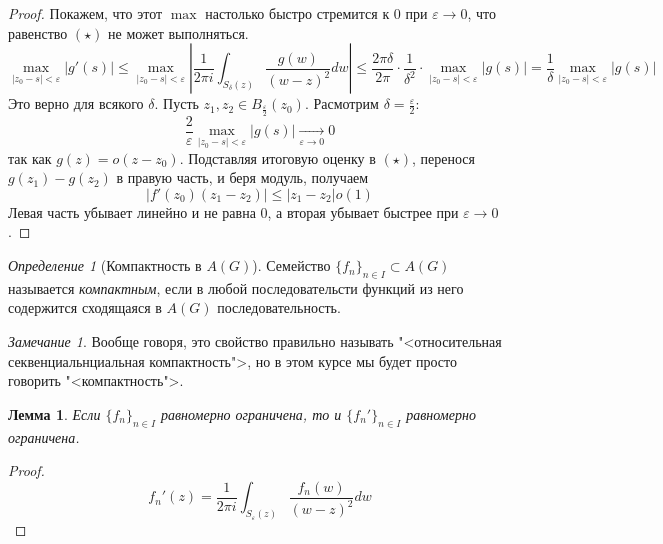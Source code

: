 \documentclass[12pt]{article}
\newcounter{cnt}
\theoremstyle{thmnote}
\newtheorem{lemma}[cnt]{Лемма}
\theoremstyle{remark}
\newtheorem*{remark}{Замечание}
\theoremstyle{defnote}
\newtheorem{definition}[cnt]{Определение}
\begin{document}
\begin{proof}
    Покажем, что этот $\max$ настолько быстро стремится к 0 при $\varepsilon \to 0$, что равенство $(\star)$ не может выполняться.
    \begin{equation*}
        \underset{|z_0 - s| < \varepsilon}{\max} |g'(s)| \leq \underset{|z_0 - s| < \varepsilon}{\max} \left| \frac{1}{2 \pi i} \int_{S_\delta(z)} \frac{g(w)}{(w - z)^2} dw \right| \leq \frac{2 \pi \delta}{2 \pi} \cdot \frac{1}{\delta^2} \cdot \underset{|z_0 - s| < \varepsilon}{\max} |g(s)| = \frac{1}{\delta} \underset{|z_0 - s| < \varepsilon}{\max} |g(s)|
    \end{equation*}
    Это верно для всякого $\delta$. Пусть $z_1, z_2 \in B_{\frac{\varepsilon}{2}}(z_0)$. Расмотрим $\delta = \frac{\varepsilon}{2}$:
    \begin{equation*}
        \frac{2}{\varepsilon} \underset{|z_0 - s| < \varepsilon}{\max} |g(s)| \underset{\varepsilon \to 0}{\longrightarrow} 0
    \end{equation*}
    так как $g(z) = o(z - z_0)$. Подставляя итоговую оценку в $(\star)$, перенося $g(z_1) - g(z_2)$ в правую часть, и беря модуль, получаем
    \begin{equation*}
        |f'(z_0) (z_1 - z_2)| \leq |z_1 - z_2| o(1)
    \end{equation*}
    Левая часть убывает линейно и не равна 0, а вторая убывает быстрее при $\varepsilon \to 0$.
\end{proof}

\begin{definition}[Компактность в $A(G)$]
    Семейство $\{f_n\}_{n \in I} \subset A(G)$ называется \textit{компактным}, если в любой последовательсти функций из него содержится сходящаяся в $A(G)$ последовательность.
\end{definition}
\begin{remark}
    Вообще говоря, это свойство правильно называть "<относительная секвенциальнциальная компактность">, но в этом курсе мы будет просто говорить "<компактность">.
\end{remark}

\begin{lemma}
    Если $\{f_n\}_{n \in I}$ равномерно ограничена, то и $\{f_n'\}_{n \in I}$ равномерно ограничена.
\end{lemma}
\begin{proof}
    \begin{equation*}
        f_n'(z) = \frac{1}{2 \pi i} \int_{S_\varepsilon(z)} \frac{f_n(w)}{(w - z)^2} dw
    \end{equation*}
\end{proof}
\end{document}
